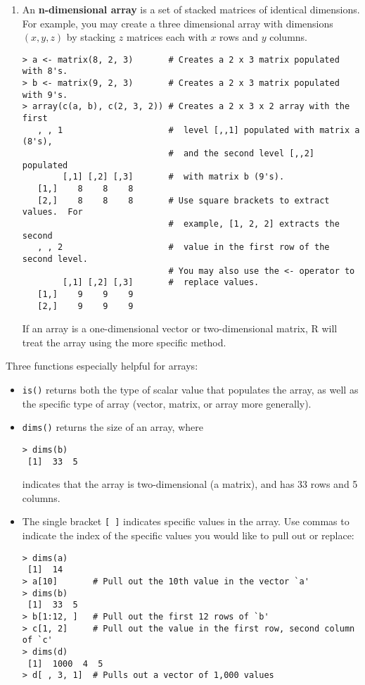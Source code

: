 \begin{enumerate}
\item An \textbf{n-dimensional array} is a set of stacked matrices of identical
  dimensions.  For example, you may create a three dimensional array
  with dimensions $(x, y, z)$ by stacking $z$ matrices each with $x$
  rows and $y$ columns.  
\begin{verbatim}
> a <- matrix(8, 2, 3)       # Creates a 2 x 3 matrix populated with 8's.
> b <- matrix(9, 2, 3)       # Creates a 2 x 3 matrix populated with 9's.
> array(c(a, b), c(2, 3, 2)) # Creates a 2 x 3 x 2 array with the first
   , , 1                     #  level [,,1] populated with matrix a (8's),
                             #  and the second level [,,2] populated 
        [,1] [,2] [,3]       #  with matrix b (9's).  
   [1,]    8    8    8       
   [2,]    8    8    8       # Use square brackets to extract values.  For
                             #  example, [1, 2, 2] extracts the second
   , , 2                     #  value in the first row of the second level.
                             # You may also use the <- operator to 
        [,1] [,2] [,3]       #  replace values.  
   [1,]    9    9    9
   [2,]    9    9    9
\end{verbatim}
If an array is a one-dimensional vector or two-dimensional matrix, R
  will treat the array using the more specific method.  
\end{enumerate}

Three functions especially helpful for
arrays:  
\begin{itemize}
\item {\tt is()} returns both the type of scalar value that populates
the array, as well as the specific type of array (vector, matrix, or
array more generally).
\item {\tt dims()} returns the size of an array, where 
\begin{verbatim}
> dims(b) 
 [1]  33  5
\end{verbatim} 
indicates that the array is two-dimensional (a matrix), and has 33
rows and 5 columns.  
\item The single bracket \verb|[ ]| indicates specific values in the
array.  Use commas to indicate the index of the specific values you
would like to pull out or replace:  
\begin{verbatim}
> dims(a)
 [1]  14
> a[10]       # Pull out the 10th value in the vector `a'
> dims(b) 
 [1]  33  5
> b[1:12, ]   # Pull out the first 12 rows of `b' 
> c[1, 2]     # Pull out the value in the first row, second column of `c'
> dims(d)
 [1]  1000  4  5
> d[ , 3, 1]  # Pulls out a vector of 1,000 values 
\end{verbatim}
\end{itemize} 

